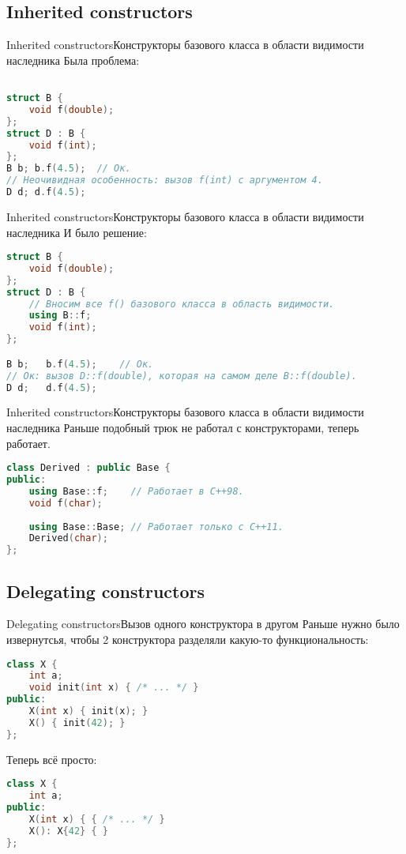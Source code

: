 \documentclass[10pt]{beamer}
\begin{document}
\subsection{Inherited constructors}
\hypertarget{Inherited constructors}{}
\begin{frame}[fragile]{Inherited constructors}{Конструкторы базового класса в области видимости наследника}
Была проблема:
\begin{lstlisting}[language=C++]

struct B {
    void f(double);
};
struct D : B {
    void f(int);
};
B b; b.f(4.5);	// Ок.
// Неочивидная особенность: вызов f(int) с аргументом 4.
D d; d.f(4.5);	
\end{lstlisting}
\end{frame}
\begin{frame}[fragile]{Inherited constructors}{Конструкторы базового класса в области видимости наследника}
И было решение:
\begin{lstlisting}[language=C++]
struct B {
    void f(double);
};
struct D : B {
    // Вносим все f() базового класса в область видимости.
    using B::f; 
    void f(int);
};

B b;   b.f(4.5);	// Ок.
// Ок: вызов D::f(double), которая на самом деле B::f(double).
D d;   d.f(4.5);	
\end{lstlisting}
\end{frame}
\begin{frame}[fragile]{Inherited constructors}{Конструкторы базового класса в области видимости наследника}
Раньше подобный трюк не работал с конструкторами, теперь работает.
\begin{lstlisting}[language=C++]
class Derived : public Base { 
public: 
    using Base::f;    // Работает в C++98.
    void f(char);
    
    using Base::Base; // Работает только с C++11.
    Derived(char);
}; 
\end{lstlisting}
\end{frame}

\subsection{Delegating constructors}
\hypertarget{Delegating constructors}{}
\begin{frame}[fragile]{Delegating constructors}{Вызов одного конструктора в другом}
Раньше нужно было извернутсья, чтобы 2 конструктора разделяли какую-то функциональность:
\begin{lstlisting}[language=C++]
class X {
    int a;
    void init(int x) { /* ... */ }
public:
    X(int x) { init(x); }
    X() { init(42); }
};
\end{lstlisting}
Теперь всё просто:
\begin{lstlisting}[language=C++]
class X {
    int a;
public:
    X(int x) { { /* ... */ }
    X(): X{42} { }
};
\end{lstlisting}
\end{frame}
\end{document}
